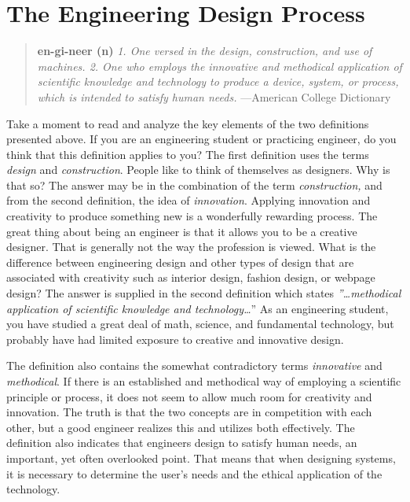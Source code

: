 \documentclass[a4paper,10pt]{book}
\begin{document}
\chapter{The Engineering Design Process}

\begin{quote}
\textbf{en-gi-neer (n)} 
\textit{1. One versed in the design, construction, and
use of machines. 2. One who employs the innovative and methodical
application of scientific knowledge and technology to produce a device,
system, or process, which is intended to satisfy human needs.} ---American College Dictionary
\end{quote}

Take a moment to read and analyze the key elements of the two
definitions presented above. If you are an engineering student or
practicing engineer, do you think that this definition applies to you?
The first definition uses the terms \emph{design} and
\emph{construction}. People like to think of themselves as designers.
Why is that so? The answer may be in the combination of the term
\emph{construction,} and from the second definition, the idea of
\emph{innovation}. Applying innovation and creativity to produce
something new is a wonderfully rewarding process. The great thing about
being an engineer is that it allows you to be a creative designer. That
is generally not the way the profession is viewed. What is the
difference between engineering design and other types of design that are
associated with creativity such as interior design, fashion design, or
webpage design? The answer is supplied in the second definition which
states \emph{''\ldots methodical application of scientific knowledge and
technology\ldots{}}'' As an engineering student, you have studied a
great deal of math, science, and fundamental technology, but probably
have had limited exposure to creative and innovative design.

The definition also contains the somewhat contradictory terms
\emph{innovative} and \emph{methodical}. If there is an established and
methodical way of employing a scientific principle or process, it does
not seem to allow much room for creativity and innovation. The truth is
that the two concepts are in competition with each other, but a good
engineer realizes this and utilizes both effectively. The definition
also indicates that engineers design to satisfy human needs, an
important, yet often overlooked point. That means that when designing
systems, it is necessary to determine the user's needs and the ethical
application of the technology.
\end{document}
